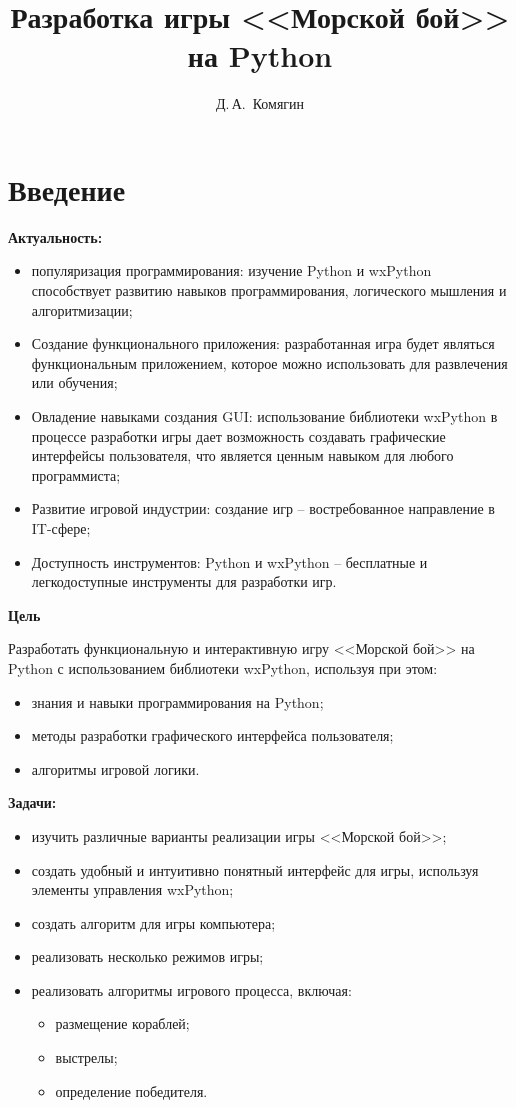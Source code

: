 \documentclass[14pt, oneside]{altsu-report}
\title{Разработка игры <<Морской бой>> на Python}
\author{Д.\,А.~Комягин}
\institute{Институт цифровых технологий, электроники и физики}
\date{\the\year}
\begin{document}
\maketitle

\setcounter{page}{2}
\makeabstract
\tableofcontents

\chapter*{Введение}

\textbf{Актуальность:}
\begin{itemize}
\item популяризация программирования: изучение Python и wxPython способствует развитию навыков программирования, логического мышления и алгоритмизации;
\item Создание функционального приложения: разработанная игра будет являться функциональным приложением, которое можно использовать для развлечения или обучения;
\item Овладение навыками создания GUI: использование библиотеки wxPython в процессе разработки игры дает возможность создавать графические интерфейсы пользователя, что является ценным навыком для любого программиста;
\item Развитие игровой индустрии: создание игр – востребованное направление в IT-сфере;
\item Доступность инструментов: Python и wxPython – бесплатные и легкодоступные инструменты для разработки игр.
\end{itemize}

\textbf{Цель}

Разработать функциональную и интерактивную игру <<Морской бой>> на Python с использованием библиотеки wxPython, используя при этом:
\begin{itemize}
\item знания и навыки программирования на Python;
\item методы разработки графического интерфейса пользователя;
\item алгоритмы игровой логики.
\end{itemize}

\textbf{Задачи:}

\begin{itemize}
\item изучить различные варианты реализации игры <<Морской бой>>;
\item создать удобный и интуитивно понятный интерфейс для игры, используя элементы управления wxPython;
\item создать алгоритм для игры компьютера;
\item реализовать несколько режимов игры;
\item реализовать алгоритмы игрового процесса, включая:
\begin{itemize}
    \item размещение кораблей;
    \item выстрелы;
    \item определение победителя.
\end{itemize}
\end{itemize}
\end{document}
